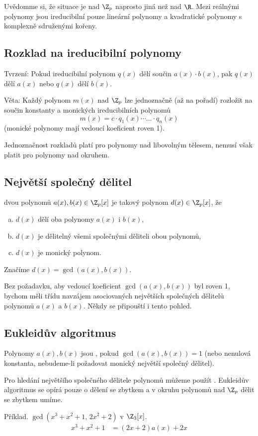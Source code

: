 Uvědomme si, že situace je nad $\Z_p$ naprosto jiná než nad $\R$. Mezi reálnými polynomy jsou ireducibilní pouze lineární polynomy a kvadratické polynomy s komplexně sdruženými kořeny.

\subsection{Rozklad na ireducibilní polynomy}
Tvrzení: Pokud ireducibilní polynom $q(x)$ dělí součin $a(x) \cdot b(x)$, pak $q(x)$ dělí $a(x)$ nebo $q(x)$ dělí $b(x)$.

Věta: Každý polynom $m(x)$ nad $\Z_p$ lze jednoznačně (až na pořadí) rozložit na součin konstanty a monických ireducibilních polynomů
\begin{equation}
	m(x) = c\cdot q_1(x) \cdots \dots \cdot q_n(x)
\end{equation}
(monické polynomy mají vedoucí koeficient roven 1).

Jednoznačnost rozkladů platí pro polynomy nad libovolným tělesem, nemusí však platit pro polynomy nad okruhem.


\subsection{Největší společný dělitel}
 dvou polynomů $a(x), b(x) \in \Z_p[x]$ je takový polynom $d(x) \in \Z_p[x]$, že
\vspace{-1em}
\begin{enumerate}[a)]
	\item $d(x)$ dělí oba polynomy $a(x)$ i $b(x)$,
	\item $d(x)$ je dělitelný všemi společnými děliteli obou polynomů,
	\item $d(x)$ je monický polynom.
\end{enumerate}
\vspace{-1em}
Značíme $d(x) = \gcd(a(x), b(x))$.

Bez požadavku, aby vedoucí koeficient $\gcd(a(x), b(x))$ byl roven 1, bychom měli třídu navzájem asociovaných největších společných dělitelů polynomů $a(x)$ a $b(x)$. Někdy se připouští i tento pohled.


\subsection{Eukleidův algoritmus}
Polynomy $a(x), b(x)$ jsou , pokud $\gcd(a(x), b(x)) = 1$ (nebo nenulová konstanta, nebudeme-li požadovat monický největší společný dělitel).

Pro hledání největšího společného dělitele polynomů můžeme použít . Eukleidův algoritmus se opírá pouze o dělení se zbytkem a v okruhu polynomů nad $\Z_p$ dělit se zbytkem umíme.

Příklad. $\gcd(x^3 + x^2 + 1, \, 2x^2 + 2)$ v $\Z_3[x]$.
\begin{align}
	x^3 + x^2 + 1 &= (2x+2)a(x) + 2x \\
\end{align}
